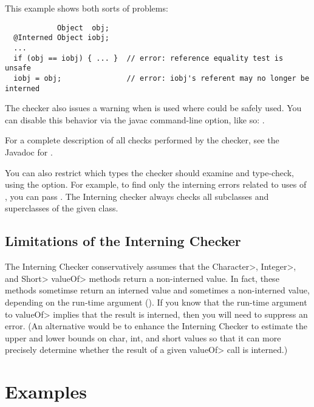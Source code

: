 This example shows both sorts of problems:

\begin{Verbatim}
            Object  obj;
  @Interned Object iobj;
  ...
  if (obj == iobj) { ... }  // error: reference equality test is unsafe
  iobj = obj;               // error: iobj's referent may no longer be interned
\end{Verbatim}

\label{lint-dotequals}

The checker also issues a warning when  is used where
\code{==} could be safely used.  You can disable this behavior via the
javac  command-line option, like so: .

For a complete description of all checks performed by
  the checker, see the Javadoc for
  .

\label{checking-class}
You can also restrict which types the checker should examine and type-check,
using the  option.  For example, to find only the
interning errors related to uses of , you can pass
.  The Interning checker always checks all
subclasses and superclasses of the given class.


\subsection{Limitations of the Interning Checker\label{interning-limitations}}


The Interning Checker conservatively assumes that the \<Character>, \<Integer>,
and \<Short> \<valueOf> methods return a non-interned value.  In fact, these
methods sometimse return an interned value and sometimes a non-interned
value, depending on the run-time argument ().  If you know that the run-time argument to \<valueOf> implies that
the result is interned, then you will need to suppress an error.  (An
alternative would be to enhance the Interning Checker to estimate the upper
and lower bounds on char, int, and short values so that it can more
precisely determine whether the result of a given \<valueOf> call is
interned.)



\section{Examples\label{interning-example}}

